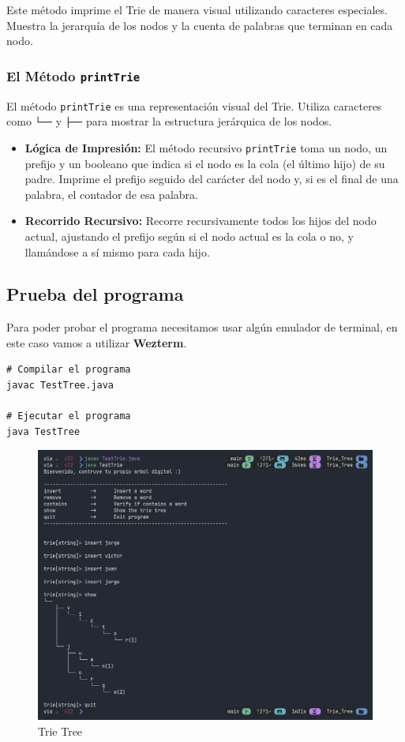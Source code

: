 \documentclass[11pt, a4paper]{article}
\begin{document}
Este método imprime el Trie de manera visual utilizando caracteres especiales. Muestra la jerarquía de los nodos y la cuenta de palabras que terminan en cada nodo.

\subsubsection{El Método \texttt{printTrie}}
El método \texttt{printTrie} es una representación visual del Trie. Utiliza caracteres como \texttt{└──} y \texttt{├──} para mostrar la estructura jerárquica de los nodos. 

\begin{itemize}
  \item \textbf{Lógica de Impresión:} El método recursivo \texttt{printTrie} toma un nodo, un prefijo y un booleano que indica si el nodo es la cola (el último hijo) de su padre. Imprime el prefijo seguido del carácter del nodo y, si es el final de una palabra, el contador de esa palabra.
  \item \textbf{Recorrido Recursivo:} Recorre recursivamente todos los hijos del nodo actual, ajustando el prefijo según si el nodo actual es la cola o no, y llamándose a sí mismo para cada hijo.
\end{itemize}

\subsection{Prueba del programa}
Para poder probar el programa necesitamos usar algún emulador de terminal, en este caso vamos a utilizar \textbf{Wezterm}.

\begin{verbatim}
# Compilar el programa
javac TestTree.java

# Ejecutar el programa
java TestTree
\end{verbatim}

\begin{figure}[H]
  \centering
  \includegraphics[width=1.0\textwidth]{img/test_trie.png}
  \caption{Trie Tree}
\end{figure}
\end{document}
